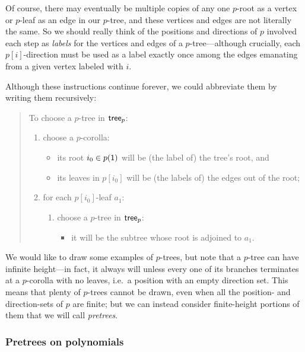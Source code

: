 \documentclass[Book-Poly]{subfiles}
\begin{document}
Of course, there may eventually be multiple copies of any one $p$-root as a vertex or $p$-leaf as an edge in our $p$-tree, and these vertices and edges are not literally the same.
So we should really think of the positions and directions of $p$ involved each step as \emph{labels} for the vertices and edges of a $p$-tree---although crucially, each $p[i]$-direction must be used as a label exactly once among the edges emanating from a given vertex labeled with $i$.

Although these instructions continue forever, we could abbreviate them by writing them recursively:
\begin{quote}
To choose a $p$-tree in $\mathsf{tree}_p$: 
\begin{enumerate}
    \item choose a $p$-corolla:
    \begin{itemize}
        \item its root $i_0\in p(\textsf{1})$ will be (the label of) the tree's root, and
        \item its leaves in $p[i_0]$ will be (the labels of) the edges out of the root;
    \end{itemize}
    \item for each $p[i_0]$-leaf $a_1$:
    \begin{enumerate}[label*=\arabic*.]
        \item choose a $p$-tree in $\mathsf{tree}_p$:
        \begin{itemize}
            \item it will be the subtree whose root is adjoined to $a_1$. 
        \end{itemize}
    \end{enumerate}
\end{enumerate}
\end{quote}

We would like to draw some examples of $p$-trees, but note that a $p$-tree can have infinite height---in fact, it always will unless every one of its branches terminates at a $p$-corolla with no leaves, i.e.\ a position with an empty direction set.
This means that plenty of $p$-trees cannot be drawn, even when all the position- and direction-sets of $p$ are finite; but we can instead consider finite-height portions of them that we will call \emph{pretrees}.

\subsubsection{Pretrees on polynomials}
\end{document}
